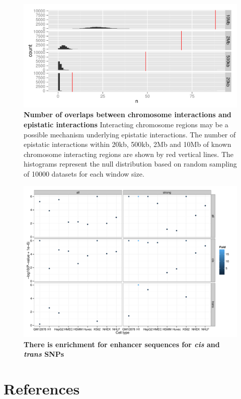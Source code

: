 \documentclass{article}
\begin{document}
\begin{figure}
	\includegraphics[width=5in]{chromosome_interactions}
	\caption{\textbf{Number of overlaps between chromosome interactions and epistatic interactions} Interacting chromosome regions may be a possible mechanism underlying epistatic interactions. The number of epistatic interactions within 20kb, 500kb, 2Mb and 10Mb of known chromosome interacting regions are shown by red vertical lines. The histograms represent the null distribution based on random sampling of 10000 datasets for each window size.}
	\label{fig:chromosomeinteractions}
\end{figure}
\clearpage

\begin{figure}
	\includegraphics[width=5in]{enhancers}
	\caption{\textbf{There is enrichment for enhancer sequences for \emph{cis} and \emph{trans} SNPs}}
	\label{fig:enhancers}
\end{figure}


\clearpage
\section{References}

\end{document}

